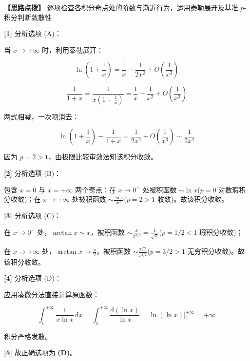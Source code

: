\documentclass[11pt,a4paper,UTF8]{ctexart}
\begin{document}
\textbf{\color{DeepPurple}【思路点拨】} 逐项检查各积分奇点处的阶数与渐近行为，运用泰勒展开及基准 $p$-积分判断敛散性


\begin{solbox}[分步推导与答题规范]
\textbf{[1]} 分析选项 (A)：

当 $x \to +\infty$ 时，利用泰勒展开：


\begin{equation*}
\ln\left(1 + \frac{1}{x}\right) = \frac{1}{x} - \frac{1}{2x^2} + O\left(\frac{1}{x^3}\right)
\end{equation*}



\begin{equation*}
\frac{1}{1+x} = \frac{1}{x\left(1+\frac{1}{x}\right)} = \frac{1}{x} - \frac{1}{x^2} + O\left(\frac{1}{x^3}\right)
\end{equation*}


两式相减，一次项消去：


\begin{equation*}
\ln\left(1 + \frac{1}{x}\right) - \frac{1}{1+x} = \frac{1}{2x^2} + O\left(\frac{1}{x^3}\right) \sim \frac{1}{2x^2}
\end{equation*}


因为 $p = 2 > 1$，由极限比较审敛法知该积分收敛。

\textbf{[2]} 分析选项 (B)：

包含 $x = 0$ 与 $x = +\infty$ 两个奇点：在 $x \to 0^+$ 处被积函数 $\sim \ln x$($p=0$ 对数瑕积分收敛)；在 $x \to +\infty$ 处被积函数 $\sim \frac{\ln x}{x^2}$($p=2>1$ 收敛)。故该积分收敛。

\textbf{[3]} 分析选项 (C)：

在 $x \to 0^+$ 处，$\arctan x \sim x$，被积函数 $\sim \frac{x}{x^{3/2}} = \frac{1}{\sqrt{x}}$($p = 1/2 < 1$ 瑕积分收敛)；

在 $x \to +\infty$ 处，$\arctan x \to \frac{\pi}{2}$，被积函数 $\sim \frac{\pi/2}{x^{3/2}}$($p = 3/2 > 1$ 无穷积分收敛)。故该积分收敛。

\textbf{[4]} 分析选项 (D)：

应用凑微分法直接计算原函数：


\begin{equation*}
\int_1^{+\infty} \frac{1}{x\ln x}\,\mathrm{d}x = \int_1^{+\infty} \frac{\mathrm{d}(\ln x)}{\ln x} = \left. \ln(\ln x) \right\vert{}_1^{+\infty} = +\infty
\end{equation*}


积分严格发散。

\textbf{[5]} 故正确选项为 \textbf{(D)}。
\end{solbox}
\end{document}
